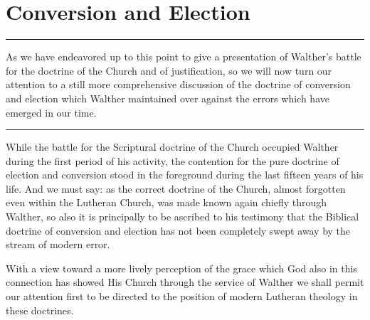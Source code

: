 \chapter{Conversion and Election}
\hrule
\vspace{.30cm}
As we have endeavored up to this point to give a presentation of Walther’s battle for the doctrine of the Church and of justification, so we will now turn our attention to a still more comprehensive discussion of the doctrine of conversion and election which Walther maintained over against the errors which have emerged in our time.
\vspace{.30cm}
\hrule
\vspace{1.25cm}
                While the battle for the Scriptural doctrine of the Church occupied Walther during the first period of his activity, the contention for the pure doctrine of election and conversion stood in the foreground during the last fifteen years of his life.  And we must say: as the correct doctrine of the Church, almost forgotten even within the Lutheran Church, was made known again chiefly through Walther, so also it is principally to be ascribed to his testimony that the Biblical doctrine of conversion and election has not been completely swept away by the stream of modern error.

                With a view toward a more lively perception of the grace which God also in this connection has showed His Church through the service of Walther we shall permit our attention first to be directed to the position of modern Lutheran theology in these doctrines.

